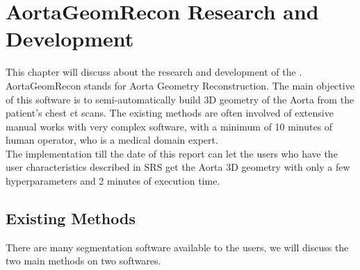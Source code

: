 \chapter{AortaGeomRecon Research and Development}
This chapter will discuss about the research and development of the \progname{}. \\
AortaGeomRecon stands for Aorta Geometry Reconstruction. The main objective of this software is to semi-automatically build 3D geometry of the Aorta from the patient's chest ct scans.  The existing methods are often involved of extensive manual works with very complex software, with a minimum of 10 minutes of human operator, who is a medical domain expert. \\
The implementation till the date of this report can let the users who have the user characteristics described in SRS get the Aorta 3D geometry with only a few hyperparameters and 2 minutes of execution time. \\


\section{Existing Methods}
There are many segmentation software available to the users, we will discuss the two main methods on two softwares.


